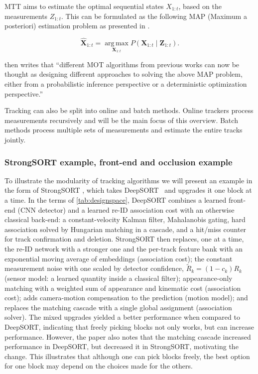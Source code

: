 MTT aims to estimate the optimal sequential states $X_{1:t}$, based on the measurements $Z_{1:t}$. This can be formulated as the following MAP (Maximum a posteriori) estimation problem as presented in \cite{mtt_litterary_review}.

\begin{equation*}
  \widehat{\mathbf{X}}_{1:t} = \operatorname*{arg\,max}_{\mathbf{X}_{1:t}} P\left(\mathbf{X}_{1:t} \mid \mathbf{Z}_{1:t}\right).
\end{equation*}

\textcite[Sec.~2]{mtt_litterary_review} then writes that ``different MOT algorithms from previous works can now be thought as designing different approaches to solving the above MAP problem, either from a probabilistic inference perspective or a deterministic optimization perspective.''
\medskip

Tracking can also be split into online and batch methods. Online trackers process measurements recursively and will be the main focus of this overview. Batch methods process multiple sets of measurements and estimate the entire tracks jointly. 

\subsubsection{StrongSORT example, front-end and occlusion example}
To illustrate the modularity of tracking algorithms we will present an example in the form of StrongSORT \cite{strongSORT}, which takes DeepSORT~\cite{deepSORT} and upgrades it one block at a time. In the terms of \autoref{tab:designspace}, DeepSORT combines a learned front-end (CNN detector) and a learned re-ID association cost with an otherwise classical back-end: a constant-velocity Kalman filter, Mahalanobis gating, hard association solved by Hungarian matching in a cascade, and a hit/miss counter for track confirmation and deletion. StrongSORT then replaces, one at a time, the re-ID network with a stronger one and the per-track feature bank with an exponential moving average of embeddings (association cost); the constant measurement noise with one scaled by detector confidence, $\tilde{R}_k = (1-c_k)R_k$ (sensor model: a learned quantity inside a classical filter); appearance-only matching with a weighted sum of appearance and kinematic cost (association cost); adds camera-motion compensation to the prediction (motion model); and replaces the matching cascade with a single global assignment (association solver). The mixed upgrades yielded a better performance when compared to DeepSORT, indicating that freely picking blocks not only works, but can increase performance. However, the paper also notes that the matching cascade increased performance in DeepSORT, but decreased it in StrongSORT, motivating the change. This illustrates that although one can pick blocks freely, the best option for one block may depend on the choices made for the others.

